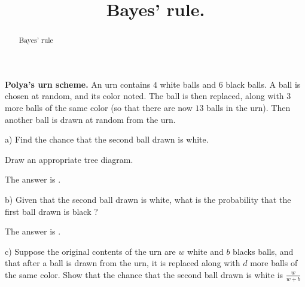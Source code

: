 \documentclass{ximera}
\title{Bayes' rule.}
\begin{document}
\begin{abstract}
Bayes' rule
\end{abstract}
\maketitle

\begin{question}
{\bf Polya's urn scheme.} An urn contains $4$ white balls and $6$ black balls. A ball is chosen at random, and its color noted. The ball is then replaced, along with $3$ more balls of the same color (so that there are now $13$ balls in the urn). Then another ball is drawn at random from the urn.

a) Find the chance that the second ball drawn is white.
     \begin{solution}
          \begin{hint}
               Draw an appropriate tree diagram.
          \end{hint}
          The answer is .
      \end{solution}

b) Given that the second ball drawn is white, what is the probability that the first ball drawn is black ?
     \begin{solution}
          The answer is .
      \end{solution}

c) Suppose the original contents of the urn are $w$ white and $b$ blacks balls, and that after a ball is drawn from the urn, it is replaced along with $d$ more balls of the same color. Show that the chance that the second ball drawn is white is $\frac{w}{w+b}$  
\end{question}
\end{document}
